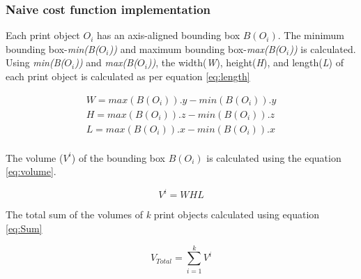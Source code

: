 \subsubsection{Naive cost function implementation }\label{costFunc}
Each print object \textit{\begin{math}O_{i}\end{math}} has an axis-aligned bounding box \textit{\begin{math} B(O_{i}) \end{math}}. The minimum bounding box-\textit{min(B(\begin{math}O_{i}\end{math}))} and maximum bounding box-\textit{max(B(\begin{math}O_{i}\end{math}))} is calculated. Using \textit{min(B(\begin{math}O_{i}\end{math}))} and \textit{max(B(\begin{math}O_{i}\end{math}))}, the width(\textit{W}), height(\textit{H}), and length(\textit{L}) of each print object is calculated as per equation \ref{eq:length}

\begin{equation}
\label{eq:length}
\begin{aligned}
W= max(B(O_{i})).y-min(B(O_{i})).y \\
H= max(B(O_{i})).z-min(B(O_{i})).z \\
L= max(B(O_{i})).x-min(B(O_{i})).x \\
\end{aligned}
\end{equation}

The volume (\begin{math}V^i\end{math}) of the bounding box \begin{math}B(O_{i})\end{math} is calculated using the equation \ref{eq:volume}.

\begin{equation}
\label{eq:volume}
V^i= WHL
\end{equation}

The total sum of the volumes of \textit{k} print objects calculated using equation \ref{eq:Sum} 

\begin{equation}
\label{eq:Sum}
V_{Total} =\sum\limits_{i=1}^{k}{V^i}
\end{equation}

